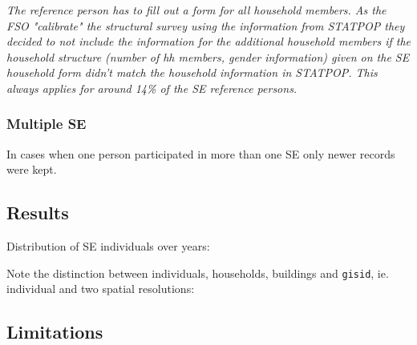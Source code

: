 \documentclass[a4paper, notitlepage, fleqn]{article} %
\begin{document}
\emph{The reference person has to fill out a form for all household members. As the FSO "calibrate" the structural survey using the information from STATPOP they decided to not include the information for the additional household members if the household structure (number of hh members, gender information) given on the SE household form didn’t match the household information in STATPOP. This always applies for around 14\% of the SE reference persons.} \\ 

\subsubsection{Multiple SE}

In cases when one person participated in more than one SE only newer records were kept.  
\begin{stlog}\end{stlog}
\subsection{Results}
Distribution of SE individuals over years:
\begin{stlog}\end{stlog}
Note the distinction between individuals, households, buildings and \texttt{gisid}, ie. individual and two spatial resolutions:
\begin{stlog}\end{stlog}
\subsection{Limitations}
\end{document}
